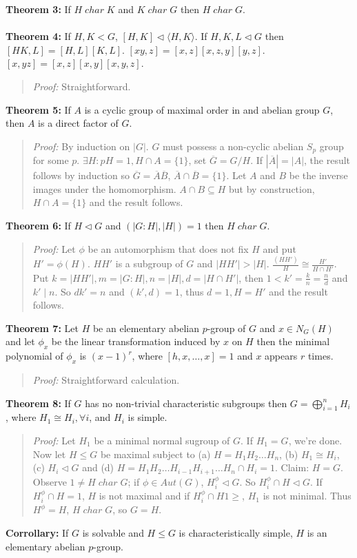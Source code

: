 {\bf Theorem 3:}
If  $H \; char \; K$ and $K \;  char \; G$ then $H \; char \; G$.
\\
\\
{\bf Theorem 4:}
If $H, K < G$, $[H,K] \lhd \langle H, K \rangle$.
If $H, K, L \lhd G$ then $[HK,L]= [H,L] [K, L]$. 
$[xy,z]= [x,z] [x,z,y] [y,z]$.
$[x, yz]= [x,z] [x,y] [x,y,z]$.
\begin{quote}
\emph{Proof:}  
Straightforward.
\end{quote}
{\bf Theorem 5:}
If $A$ is a cyclic group of maximal order in and abelian group $G$, then $A$ is a direct
factor of $G$.
\begin{quote}
\emph{Proof:}  
By induction on $|G|$.
$G$ must possess a non-cyclic abelian $S_p$ group for some $p$.
$\exists H: pH=1, H \cap A = \{ 1 \}$, set ${\overline G}= G/H$.
If $|{\overline A}|= |A|$, the result follows by induction so
${\overline G} = {\overline A} {\overline B}$,
${\overline A} \cap {\overline B} = \{ 1 \}$.  Let $A$ and $B$ be the inverse images
under the homomorphism.  $A \cap B \subseteq H$ but by construction, $H \cap A= \{ 1 \}$
and the result follows.
\end{quote}
{\bf Theorem 6:}
If $H \lhd G$ and $(|G:H|, |H|)=1$ then $H \; char \; G$.
\begin{quote}
\emph{Proof:}  
Let $\phi$ be an automorphism that does not fix $H$ and put $H'= \phi(H)$.
$H H'$ is a subgroup of $G$ and
$|H H'| > |H|$.  ${\frac {(H H')} {H}} \cong {\frac {H'} {H \cap H'}}$.
Put $k= |H H'|, m= |G:H|, n= |H|, d= | H \cap H' |$,  then 
$ 1 < k'= {\frac {k} {n}} =  {\frac n d}$ and $k' \mid n$.  So $dk'= n$ and $(k', d)=1$,
thus $d=1, H = H'$ and the result follows.
\end{quote}
{\bf Theorem 7:}
Let $H$ be an elementary abelian $p$-group of $G$ and $x \in N_G(H)$ and let $\phi_x$
be the linear transformation induced by $x$ on $H$ then the minimal polynomial of
$\phi_x$ is $(x-1)^r$, where $[h,x, \ldots, x]= 1$ and $x$ appears $r$ times.
\begin{quote}
\emph{Proof:}  
Straightforward calculation.
\end{quote}
{\bf Theorem 8:}  If $G$ has no non-trivial characteristic subgroups then
$G= \bigoplus_{i=1}^n H_i$, where $H_1 \cong H_i, \forall i$, and $H_i$ is
simple.
\begin{quote}
\emph{Proof:} Let $H_1$ be a minimal normal sugroup of $G$.  If $H_1 = G$, we're done.
Now let $H \le G$ be maximal subject to (a) $H=H_1 H_2 \ldots H_n$, (b) $H_1 \cong H_i$,
(c) $H_i \lhd G$ and (d)
$H=H_1 H_2 \ldots H_{i-1} H_{i+1} \ldots H_n \cap H_i = 1$.  Claim:  $H=G$.  Observe
$1 \ne H \; char \; G$; if $\phi \in Aut(G)$, 
$H_i^{\phi} \lhd G$.
So $H_i^{\phi} \cap H \lhd G$.
If $H_i^{\phi} \cap H =1$, $H$ is not maximal and if
$H_i^{\phi} \cap H 1\ge $, $H_1$ is not minimal.
Thus $H^{\phi} = H$, $H \; char \; G$, so $G=H$.
\end{quote}
{\bf Corrollary:} If $G$ is solvable and $H \le G$ is characteristically simple, $H$
is an elementary abelian $p$-group.

